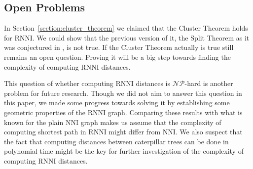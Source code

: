 \documentclass{amsart}
\newcommand{\np}{\mathcal{NP}}
\newcommand{\nni}{\mathrm{NNI}}
\newcommand{\rnni}{\mathrm{RNNI}}
\begin{document}
\subsection{Open Problems}

In Section~\ref{section:cluster_theorem} we claimed that the Cluster Theorem holds for $\rnni$.
We could show that the previous version of it, the Split Theorem as it was conjectured in \autocite{Gavryushkin2018-ol}, is not true.
If the Cluster Theorem actually is true still remains an open question.
Proving it will be a big step towards finding the complexity of computing $\rnni$ distances.

This question of whether computing $\rnni$ distances is $\np$-hard is another problem for future research.
Though we did not aim to answer this question in this paper, we made some progress towards solving it by establishing some geometric properties of the $\rnni$ graph.
Comparing these results with what is known for the plain $\nni$ graph makes us assume that the complexity of computing shortest path in $\rnni$ might differ from $\nni$.
We also suspect that the fact that computing distances between caterpillar trees can be done in polynomial time might be the key for further investigation of the complexity of computing $\rnni$ distances.




\printbibliography
\end{document}
